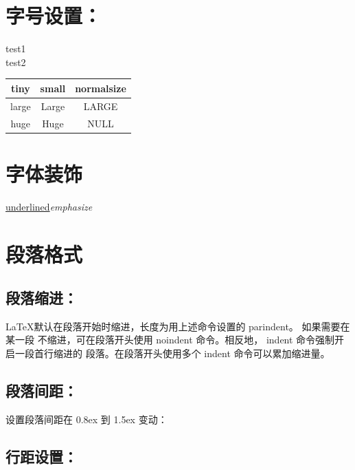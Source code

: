 \documentclass[10pt,a4paper,twocolumn]{book}
\renewcommand{\baselinestretch}{1} %
\begin{document}
\section{字号设置：}
\fontsize{12}{14}
test1\\
test2\\[5pt]
\begin{tabular}{|*{3}{c|}}
    \hline
    {\tiny tiny}   & {\small small} &{\normalsize normalsize} \\ \hline
    {\large large} & {\Large Large} &{\LARGE LARGE}   \\ \hline
    {\huge huge}   & {\Huge Huge}   &{NULL}\\ \hline
\end{tabular}

\section{字体装饰}
\underline{underlined}\qquad \emph{emphasize}

\section{段落格式}

\subsection{段落缩进：}

{
    \par
{} \par
{}\par
}
\LaTeX 默认在段落开始时缩进，长度为用上述命令设置的 parindent。
如果需要在某一段 不缩进，可在段落开头使用 noindent 命令。相反地，
indent 命令强制开启一段首行缩进的 段落。在段落开头使用多个 indent 
命令可以累加缩进量。

\subsection{段落间距：}
设置段落间距在 0.8ex 到 1.5ex 变动：
\setlength{\parskip}{1ex plus 0.5ex minus 0.2ex}
\subsection{行距设置：}

\end{document}
